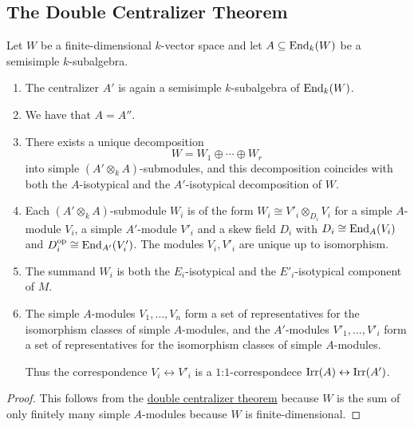 \subsection*{The Double Centralizer Theorem}


\begin{corollary}
  \label{corollary: special double centralizer theorem}
  Let $W$ be a finite-dimensional $k$-vector space and let $A \subseteq \operatorname{End}_k(W)$ be a semisimple $k$-subalgebra.
  \begin{enumerate}
    \item
      The centralizer $A'$ is again a semisimple $k$-subalgebra of $\operatorname{End}_k(W)$.
    \item
      We have that $A = A''$.
    \item
      There exists a unique decomposition
      \[
        W = W_1 \oplus \dotsb \oplus W_r
      \]
      into simple $(A' \otimes_k A)$-submodules, and this decomposition coincides with both the $A$-isotypical and the $A'$-isotypical decomposition of $W$.
    \item
      Each $(A' \otimes_k A)$-submodule $W_i$ is of the form $W_i \cong V'_i \otimes_{D_i} V_i$ for a simple $A$-module $V_i$, a simple $A'$-module $V'_i$ and a skew field $D_i$ with $D_i \cong \operatorname{End}_A(V_i)$ and $D_i^{\operatorname{op}} \cong \operatorname{End}_{A'}(V'_i)$.
      The modules $V_i, V'_i$ are unique up to isomorphism.
    \item
      The summand $W_i$ is both the $E_i$-isotypical and the $E'_i$-isotypical component of $M$.
    \item
      The simple $A$-modules $V_1, \dotsc, V_n$ form a set of representatives for the isomorphism classes of simple $A$-modules, and the $A'$-modules $V'_1, \dotsc, V'_i$ form a set of representatives for the isomorphism classes of simple $A$-modules.
      
      Thus the correspondence $V_i \leftrightarrow V'_i$ is a $1$:$1$-correspondece $\operatorname{Irr}(A) \leftrightarrow \operatorname{Irr}(A')$.
  \end{enumerate}
\end{corollary}


\begin{proof}
  This follows from the \hyperref[theorem: general double centralizer theorem]{double centralizer theorem} because $W$ is the sum of only finitely many simple $A$-modules because $W$ is finite-dimensional.
\end{proof}



